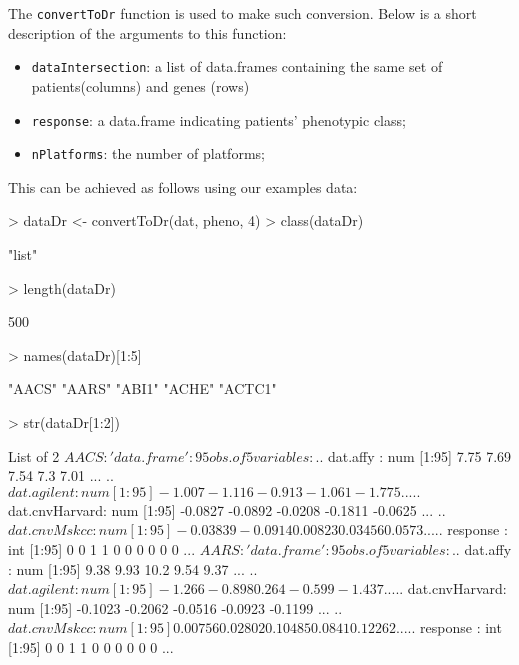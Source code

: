 \documentclass[11pt]{article}
\newcommand{\Rfunction}[1]{{\texttt{#1}}}
\newcommand{\Rfunarg}[1]{{\texttt{#1}}}
\begin{document}
The \Rfunction{convertToDr} function is used to make such conversion.
Below is a short description of the arguments to this function:
\begin{itemize}
  \item \Rfunarg{dataIntersection}: a list of data.frames containing the same set of patients(columns) and genes (rows)
  \item \Rfunarg{response}: a data.frame indicating patients' phenotypic class;
  \item \Rfunarg{nPlatforms}: the number of platforms;
\end{itemize}

This can be achieved as follows using our examples data:

\begin{Schunk}
\begin{Sinput}
> dataDr <- convertToDr(dat, pheno, 4)
> class(dataDr)
\end{Sinput}
\begin{Soutput}
[1] "list"
\end{Soutput}
\begin{Sinput}
> length(dataDr)
\end{Sinput}
\begin{Soutput}
[1] 500
\end{Soutput}
\begin{Sinput}
> names(dataDr)[1:5]
\end{Sinput}
\begin{Soutput}
[1] "AACS"  "AARS"  "ABI1"  "ACHE"  "ACTC1"
\end{Soutput}
\begin{Sinput}
> str(dataDr[1:2])
\end{Sinput}
\begin{Soutput}
List of 2
 $ AACS:'data.frame':	95 obs. of  5 variables:
  ..$ dat.affy      : num [1:95] 7.75 7.69 7.54 7.3 7.01 ...
  ..$ dat.agilent   : num [1:95] -1.007 -1.116 -0.913 -1.061 -1.775 ...
  ..$ dat.cnvHarvard: num [1:95] -0.0827 -0.0892 -0.0208 -0.1811 -0.0625 ...
  ..$ dat.cnvMskcc  : num [1:95] -0.03839 -0.0914 0.00823 0.03456 0.0573 ...
  ..$ response      : int [1:95] 0 0 1 1 0 0 0 0 0 0 ...
 $ AARS:'data.frame':	95 obs. of  5 variables:
  ..$ dat.affy      : num [1:95] 9.38 9.93 10.2 9.54 9.37 ...
  ..$ dat.agilent   : num [1:95] -1.266 -0.898 0.264 -0.599 -1.437 ...
  ..$ dat.cnvHarvard: num [1:95] -0.1023 -0.2062 -0.0516 -0.0923 -0.1199 ...
  ..$ dat.cnvMskcc  : num [1:95] 0.00756 0.02802 0.10485 0.0841 0.12262 ...
  ..$ response      : int [1:95] 0 0 1 1 0 0 0 0 0 0 ...
\end{Soutput}
\end{Schunk}
\end{document}
